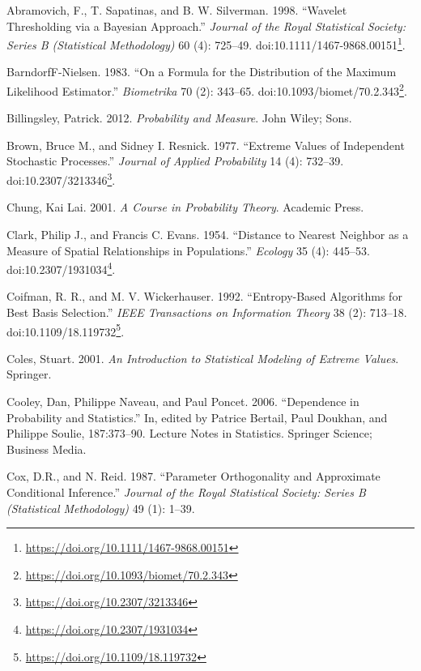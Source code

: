 \documentclass[b5paper,]{book}
\let\rmarkdownfootnote\footnote%
\def\footnote{\protect\rmarkdownfootnote}
\renewcommand{\href}[2]{#2\footnote{\url{#1}}}
\theoremstyle{definition}
\theoremstyle{definition}
\theoremstyle{definition}
\theoremstyle{remark}
\begin{document}
\hypertarget{refs}{}
\hypertarget{ref-Abramovich1998}{}
Abramovich, F., T. Sapatinas, and B. W. Silverman. 1998. ``Wavelet
Thresholding via a Bayesian Approach.'' \emph{Journal of the Royal
Statistical Society: Series B (Statistical Methodology)} 60 (4):
725--49.
doi:\href{https://doi.org/10.1111/1467-9868.00151}{10.1111/1467-9868.00151}.

\hypertarget{ref-BarndorfF-Nielsen1983}{}
BarndorfF-Nielsen. 1983. ``On a Formula for the Distribution of the
Maximum Likelihood Estimator.'' \emph{Biometrika} 70 (2): 343--65.
doi:\href{https://doi.org/10.1093/biomet/70.2.343}{10.1093/biomet/70.2.343}.

\hypertarget{ref-Billingsley2012}{}
Billingsley, Patrick. 2012. \emph{Probability and Measure}. John Wiley;
Sons.

\hypertarget{ref-Brown1977}{}
Brown, Bruce M., and Sidney I. Resnick. 1977. ``Extreme Values of
Independent Stochastic Processes.'' \emph{Journal of Applied
Probability} 14 (4): 732--39.
doi:\href{https://doi.org/10.2307/3213346}{10.2307/3213346}.

\hypertarget{ref-Chung2001}{}
Chung, Kai Lai. 2001. \emph{A Course in Probability Theory}. Academic
Press.

\hypertarget{ref-Clark1954}{}
Clark, Philip J., and Francis C. Evans. 1954. ``Distance to Nearest
Neighbor as a Measure of Spatial Relationships in Populations.''
\emph{Ecology} 35 (4): 445--53.
doi:\href{https://doi.org/10.2307/1931034}{10.2307/1931034}.

\hypertarget{ref-Coifman1992}{}
Coifman, R. R., and M. V. Wickerhauser. 1992. ``Entropy-Based Algorithms
for Best Basis Selection.'' \emph{IEEE Transactions on Information
Theory} 38 (2): 713--18.
doi:\href{https://doi.org/10.1109/18.119732}{10.1109/18.119732}.

\hypertarget{ref-Coles2001}{}
Coles, Stuart. 2001. \emph{An Introduction to Statistical Modeling of
Extreme Values}. Springer.

\hypertarget{ref-Cooley2006}{}
Cooley, Dan, Philippe Naveau, and Paul Poncet. 2006. ``Dependence in
Probability and Statistics.'' In, edited by Patrice Bertail, Paul
Doukhan, and Philippe Soulie, 187:373--90. Lecture Notes in Statistics.
Springer Science; Business Media.

\hypertarget{ref-Cox1987}{}
Cox, D.R., and N. Reid. 1987. ``Parameter Orthogonality and Approximate
Conditional Inference.'' \emph{Journal of the Royal Statistical Society:
Series B (Statistical Methodology)} 49 (1): 1--39.
\end{document}
